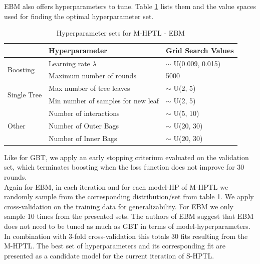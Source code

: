 \documentclass[12pt,titlepage]{article}
\begin{document}
EBM also offers hyperparameters to tune. Table \ref{hpebm} lists them and the value spaces used for finding the optimal hyperparameter set. \\
\begin{table}[H]
    \centering
    \begin{tabular}{|l|l|l|}
    \hline
    \multicolumn{1}{|l|}{}                                       & Hyperparameter                            & Grid Search Values       \\
    \hline
    \multirow{2}{*}{Boosting}                         & Learning rate $\lambda$                                                                & $\sim$ U(0.009, 0.015)  \\
    & Maximum number of rounds            &         5000        \\
    \hline
    \multicolumn{1}{|l|}{\multirow{2}{*}{Single Tree}} & Max number of tree leaves          &  $\sim$ U(2, 5)                        \\
    \multicolumn{1}{|l|}{}                                       & Min number of samples for new leaf   &      $\sim$ U(2, 5)       \\
    \hline
    \multicolumn{1}{|l|}{\multirow{3}{*}{Other}} & Number of interactions          &       $\sim$ U(5, 10)      \\
    \multicolumn{1}{|l|}{}                                       & Number of Outer Bags   &        $\sim$ U(20, 30)   \\
    \multicolumn{1}{|l|}{}                                       & Number of Inner Bags   &       $\sim$ U(20, 30)   \\
    \hline
    \end{tabular}
    \caption{Hyperparameter sets for M-HPTL - EBM}
\label{hpebm}
\end{table}
\vspace{3mm}
\noindent
Like for GBT, we apply an early stopping criterium evaluated on the validation set, which terminates boosting when the loss function does not improve for 30 rounds. \\
Again for EBM, in each iteration and for each model-HP of M-HPTL we randomly sample from the corresponding distribution/set from table \ref{hpebm}. We apply cross-validation on the training data for generalizability. For EBM we only sample 10 times from the presented sets. The authors of EBM suggest that EBM does not need to be tuned as much as GBT in terms of model-hyperparameters. In combination with 3-fold cross-validation this totals 30 fits resulting from the M-HPTL. The best set of hyperparameters and its corresponding fit are presented as a candidate model for the current iteration of S-HPTL.\\
\end{document}
